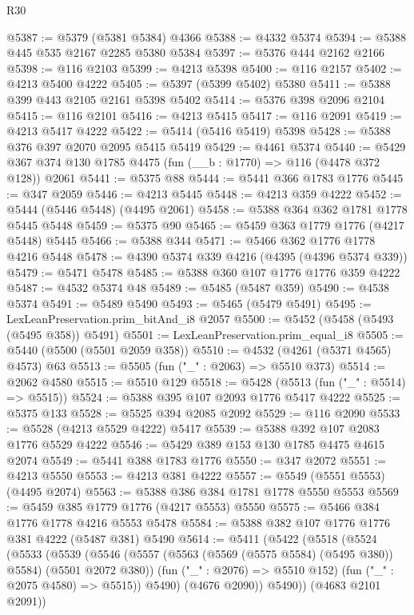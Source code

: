 \begin{lexlean}{R30}
\begin{coremodule}
@5387 := @5379 (@5381 @5384) @4366
@5388 := @4332 @5374
@5394 := @5388 @445 @535 @2167 @2285 @5380 @5384
@5397 := @5376 @444 @2162 @2166
@5398 := @116 @2103
@5399 := @4213 @5398
@5400 := @116 @2157
@5402 := @4213 @5400 @4222
@5405 := @5397 (@5399 @5402) @5380
@5411 := @5388 @399 @443 @2105 @2161 @5398 @5402
@5414 := @5376 @398 @2096 @2104
@5415 := @116 @2101
@5416 := @4213 @5415
@5417 := @116 @2091
@5419 := @4213 @5417 @4222
@5422 := @5414 (@5416 @5419) @5398
@5428 := @5388 @376 @397 @2070 @2095 @5415 @5419
@5429 := @4461 @5374
@5440 := @5429 @367 @374 @130 @1785 @4475 (fun (__b : @1770) => @116 (@4478 @372 @128)) @2061
@5441 := @5375 @88
@5444 := @5441 @366 @1783 @1776
@5445 := @347 @2059
@5446 := @4213 @5445
@5448 := @4213 @359 @4222
@5452 := @5444 (@5446 @5448) (@4495 @2061)
@5458 := @5388 @364 @362 @1781 @1778 @5445 @5448
@5459 := @5375 @90
@5465 := @5459 @363 @1779 @1776 (@4217 @5448) @5445
@5466 := @5388 @344
@5471 := @5466 @362 @1776 @1778 @4216 @5448
@5478 := @4390 @5374 @339 @4216 (@4395 (@4396 @5374 @339))
@5479 := @5471 @5478
@5485 := @5388 @360 @107 @1776 @1776 @359 @4222
@5487 := @4532 @5374 @48
@5489 := @5485 (@5487 @359)
@5490 := @4538 @5374
@5491 := @5489 @5490
@5493 := @5465 (@5479 @5491)
@5495 := LexLeanPreservation.prim_bitAnd_i8 @2057
@5500 := @5452 (@5458 (@5493 (@5495 @358)) @5491)
@5501 := LexLeanPreservation.prim_equal_i8
@5505 := @5440 (@5500 (@5501 @2059 @358))
@5510 := @4532 (@4261 (@5371 @4565) @4573) @63
@5513 := @5505 (fun ("_" : @2063) => @5510 @373)
@5514 := @2062 @4580
@5515 := @5510 @129
@5518 := @5428 (@5513 (fun ("_" : @5514) => @5515))
@5524 := @5388 @395 @107 @2093 @1776 @5417 @4222
@5525 := @5375 @133
@5528 := @5525 @394 @2085 @2092
@5529 := @116 @2090
@5533 := @5528 (@4213 @5529 @4222) @5417
@5539 := @5388 @392 @107 @2083 @1776 @5529 @4222
@5546 := @5429 @389 @153 @130 @1785 @4475 @4615 @2074
@5549 := @5441 @388 @1783 @1776
@5550 := @347 @2072
@5551 := @4213 @5550
@5553 := @4213 @381 @4222
@5557 := @5549 (@5551 @5553) (@4495 @2074)
@5563 := @5388 @386 @384 @1781 @1778 @5550 @5553
@5569 := @5459 @385 @1779 @1776 (@4217 @5553) @5550
@5575 := @5466 @384 @1776 @1778 @4216 @5553 @5478
@5584 := @5388 @382 @107 @1776 @1776 @381 @4222 (@5487 @381) @5490
@5614 := @5411
    (@5422
      (@5518
        (@5524
          (@5533
            (@5539
              (@5546
                (@5557 (@5563 (@5569 (@5575 @5584) (@5495 @380)) @5584) (@5501 @2072 @380))
                (fun ("_" : @2076) => @5510 @152)
                (fun ("_" : @2075 @4580) => @5515))
              @5490)
            (@4676 @2090))
          @5490))
      (@4683 @2101 @2091))

\end{coremodule}
\end{lexlean}
